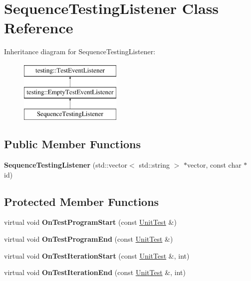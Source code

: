 \hypertarget{class_sequence_testing_listener}{}\section{Sequence\+Testing\+Listener Class Reference}
\label{class_sequence_testing_listener}
Inheritance diagram for Sequence\+Testing\+Listener\+:\begin{figure}[H]
\begin{center}
\leavevmode
\includegraphics[height=3.000000cm]{class_sequence_testing_listener}
\end{center}
\end{figure}
\subsection*{Public Member Functions}
\begin{DoxyCompactItemize}
\item 
\mbox{\label{class_sequence_testing_listener_ac0fcb350d20876f8273621ad4c79ba7a}} 
{\bfseries Sequence\+Testing\+Listener} (std\+::vector$<$ std\+::string $>$ $\ast$vector, const char $\ast$id)
\end{DoxyCompactItemize}
\subsection*{Protected Member Functions}
\begin{DoxyCompactItemize}
\item 
\mbox{\label{class_sequence_testing_listener_a25b96acdbaa6f582e583e6b56bd39b42}} 
virtual void {\bfseries On\+Test\+Program\+Start} (const \mbox{\hyperlink{classtesting_1_1_unit_test}{Unit\+Test}} \&)
\item 
\mbox{\label{class_sequence_testing_listener_aacac5e15bac089460841ff63a5c31f57}} 
virtual void {\bfseries On\+Test\+Program\+End} (const \mbox{\hyperlink{classtesting_1_1_unit_test}{Unit\+Test}} \&)
\item 
\mbox{\label{class_sequence_testing_listener_a345641262fa10cc4b251ac54116db74b}} 
virtual void {\bfseries On\+Test\+Iteration\+Start} (const \mbox{\hyperlink{classtesting_1_1_unit_test}{Unit\+Test}} \&, int)
\item 
\mbox{\label{class_sequence_testing_listener_a783bc01e2a95f5bf73bbde4d96832e0f}} 
virtual void {\bfseries On\+Test\+Iteration\+End} (const \mbox{\hyperlink{classtesting_1_1_unit_test}{Unit\+Test}} \&, int)
\end{DoxyCompactItemize}


